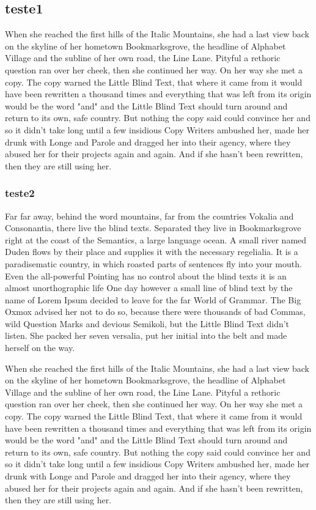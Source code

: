 \documentclass[11pt,a4paper,twoside,openright]{book}
\begin{document}
\begin{sloppy}
\subsection{teste1}
When she reached the first hills of the Italic Mountains, she had a last view back on the skyline of her hometown Bookmarksgrove, the headline of Alphabet Village and the subline of her own road, the Line Lane. Pityful a rethoric question ran over her cheek, then she continued her way. On her way she met a copy. The copy warned the Little Blind Text, that where it came from it would have been rewritten a thousand times and everything that was left from its origin would be the word "and" and the Little Blind Text should turn around and return to its own, safe country. But nothing the copy said could convince her and so it didn’t take long until a few insidious Copy Writers ambushed her, made her drunk with Longe and Parole and dragged her into their agency, where they abused her for their projects again and again. And if she hasn’t been rewritten, then they are still using her.

\subsubsection{teste2}

Far far away, behind the word mountains, far from the countries Vokalia and Consonantia, there live the blind texts. Separated they live in Bookmarksgrove right at the coast of the Semantics, a large language ocean. A small river named Duden flows by their place and supplies it with the necessary regelialia. It is a paradisematic country, in which roasted parts of sentences fly into your mouth. Even the all-powerful Pointing has no control about the blind texts it is an almost unorthographic life One day however a small line of blind text by the name of Lorem Ipsum decided to leave for the far World of Grammar. The Big Oxmox advised her not to do so, because there were thousands of bad Commas, wild Question Marks and devious Semikoli, but the Little Blind Text didn’t listen. She packed her seven versalia, put her initial into the belt and made herself on the way.

When she reached the first hills of the Italic Mountains, she had a last view back on the skyline of her hometown Bookmarksgrove, the headline of Alphabet Village and the subline of her own road, the Line Lane. Pityful a rethoric question ran over her cheek, then she continued her way. On her way she met a copy. The copy warned the Little Blind Text, that where it came from it would have been rewritten a thousand times and everything that was left from its origin would be the word "and" and the Little Blind Text should turn around and return to its own, safe country. But nothing the copy said could convince her and so it didn’t take long until a few insidious Copy Writers ambushed her, made her drunk with Longe and Parole and dragged her into their agency, where they abused her for their projects again and again. And if she hasn’t been rewritten, then they are still using her.


\end{sloppy}
\end{document}
